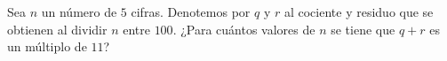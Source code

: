 Sea $n$ un número de $5$ cifras. Denotemos por $q$ y $r$ al cociente y residuo que se obtienen al dividir $n$ entre $100$. ¿Para cuántos valores de $n$ se tiene que $q + r$ es un múltiplo de $11$?